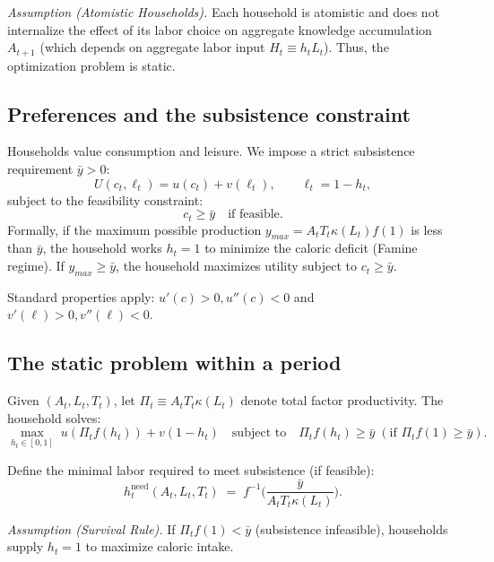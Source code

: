 \documentclass[11pt,a4paper]{article}
\begin{document}
\textit{Assumption (Atomistic Households).} Each household is atomistic and does not internalize the effect of its labor choice on aggregate knowledge accumulation \(A_{t+1}\) (which depends on aggregate labor input \(H_t \equiv h_t L_t\)). Thus, the optimization problem is static.

\subsection*{Preferences and the subsistence constraint}

Households value consumption and leisure. We impose a strict subsistence requirement \(\bar y>0\):
\begin{equation}
  U(c_t,\ell_t) = u(c_t) + v(\ell_t), \qquad \ell_t=1-h_t,
  \label{eq:U_def}
\end{equation}
subject to the feasibility constraint:
\begin{equation}
  c_t \ge \bar y \quad \text{if feasible}.
  \label{eq:subsistence_constraint}
\end{equation}
Formally, if the maximum possible production \(y_{max} = A_t T_t \kappa(L_t) f(1)\) is less than \(\bar y\), the household works \(h_t=1\) to minimize the caloric deficit (Famine regime). If \(y_{max} \ge \bar y\), the household maximizes utility subject to \(c_t \ge \bar y\).

Standard properties apply: \(u'(c)>0, u''(c)<0\) and \(v'(\ell)>0, v''(\ell)<0\).

\subsection*{The static problem within a period}

Given \((A_t,L_t,T_t)\), let \(\Pi_t \equiv A_t T_t \kappa(L_t)\) denote total factor productivity. The household solves:
\begin{equation}
  \max_{h_t\in[0,1]} \; u(\Pi_t f(h_t)) + v(1-h_t)
  \quad\text{subject to}\quad
  \Pi_t f(h_t) \ge \bar{y} \; (\text{if } \Pi_t f(1) \ge \bar{y}).
  \label{eq:static_problem}
\end{equation}

Define the minimal labor required to meet subsistence (if feasible):
\begin{equation}
  h_t^{\text{need}}(A_t,L_t,T_t)
  \;=\;
  f^{-1}\!\Bigg(\frac{\bar y}{A_t T_t \kappa(L_t)}\Bigg).
  \label{eq:h_need_closed}
\end{equation}

\textit{Assumption (Survival Rule).} If \(\Pi_t f(1) < \bar y\) (subsistence infeasible), households supply \(h_t=1\) to maximize caloric intake.
\end{document}
